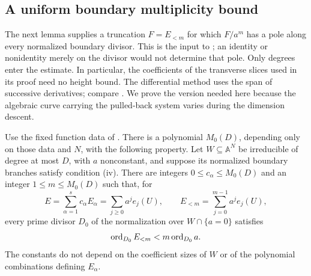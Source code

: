 \subsection{A uniform boundary multiplicity bound}

The next lemma supplies a truncation $F=E_{<m}$ for which $F/a^m$ has
a pole along every normalized boundary divisor.  This is the input to
; an identity or nonidentity merely on the divisor
would not determine that pole.  Only degrees enter the estimate.  In
particular, the coefficients of the transverse slices used in its proof
need no height bound.
The differential method uses the span of successive derivatives;
compare \cite[Theorem~1]{BertrandBeukers1985}. We prove the version
needed here because the algebraic curve carrying the pulled-back
system varies during the dimension descent.

\begin{lemma}\label{int:multiplicity}
Use the fixed function data of .  There is a polynomial
$M_0(D)$, depending only on those data and $N$, with the following property.
Let $W\subseteq\mathbb A^N$ be irreducible of degree at most $D$, with
$a$ nonconstant, and suppose its normalized boundary branches satisfy
condition \textup{(iv)}.  There are integers
$0\leq c_\alpha\leq M_0(D)$ and an integer
$1\leq m\leq M_0(D)$ such that, for
\[
 E=\sum_{\alpha=1}^s c_\alpha E_\alpha
   =\sum_{j\geq0}a^j e_j(U),
 \qquad E_{<m}=\sum_{j=0}^{m-1}a^je_j(U),
\]
every prime divisor $D_0$ of the normalization over $W\cap\{a=0\}$
satisfies
\begin{equation}\label{int:strict-order}
 \operatorname{ord}_{D_0}E_{<m}<m\operatorname{ord}_{D_0}a.
\end{equation}
The constants do not depend on the coefficient sizes of $W$ or of the
polynomial combinations defining $E_\alpha$.
\end{lemma}

